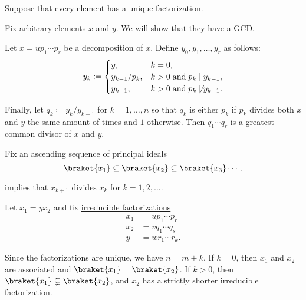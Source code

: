 \begin{defproof}
   Suppose that every element has a unique factorization.

   Fix arbitrary elements \( x \) and \( y \). We will show that they have a GCD.

  Let \( x = u p_1 \cdots p_r \) be a decomposition of \( x \). Define \( y_0, y_1, \ldots, y_r \) as follows:
  \begin{equation*}
    y_k \coloneqq \begin{cases}
      y,             &k = 0, \\
      y_{k-1} / p_k, &k > 0 \T{and} p_k \mid y_{k-1}, \\
      y_{k-1},       &k > 0 \T{and} p_k \not\mid y_{k-1}.
    \end{cases}
  \end{equation*}

  Finally, let \( q_k \coloneqq y_k / y_{k-1} \) for \( k = 1, \ldots, n \) so that \( q_k \) is either \( p_k \) if \( p_k \) divides both \( x \) and \( y \) the same amount of times and \( 1 \) otherwise. Then \( q_1 \cdots q_r \) is a greatest common divisor of \( x \) and \( y \).

   Fix an ascending sequence of principal ideals
  \begin{equation*}
    \braket{ x_1 } \subseteq \braket{ x_2 } \subseteq \braket{ x_3 } \cdots.
  \end{equation*}

   implies that \( x_{k+1} \) divides \( x_k \) for \( k = 1, 2, \ldots \).

  Let \( x_1 = y x_2 \) and fix \hyperref[def:irreducible_factorization]{irreducible factorizations}
  \begin{align*}
    x_1 &= u p_1 \cdots p_r \\
    x_2 &= v q_1 \cdots q_s \\
    y   &= w r_1 \cdots r_k.
  \end{align*}

  Since the factorizations are unique, we have \( n = m + k \). If \( k = 0 \), then \( x_1 \) and \( x_2 \) are associated and \( \braket{ x_1 } = \braket{ x_2 } \). If \( k > 0 \), then \( \braket{ x_1 } \subsetneq \braket{ x_2 } \), and \( x_2 \) has a strictly shorter irreducible factorization.


\end{defproof}
